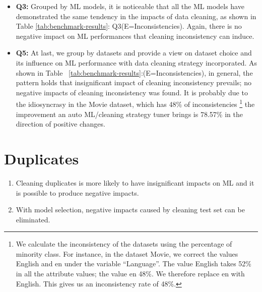 \begin{itemize}
	\item {
		\textbf{Q3:} Grouped by ML models, it is noticeable that all the ML models have demonstrated the same tendency in the impacts of data
		cleaning, as shown in Table \ref{tab:benchmark-results}: Q3(E=Inconsistencies). Again, there is no negative impact on ML performances that cleaning inconsistency can induce.
	}

	\item {
		\textbf{Q5:} At last, we group by datasets and provide a view on dataset
		choice and its influence on ML performance with data cleaning strategy incorporated. As shown in Table ~\ref{tab:benchmark-results}:(E=Inconsistencies),
		in general, the pattern holds that insignificant impact of cleaning inconsistency prevails; no negative impacts of cleaning inconsistency
		was found. It is probably due to the idiosyncrasy in the Movie
		dataset, which has 48\% of inconsistencies \footnote{We calculate the inconsistency of the datasets using the percentage of minority class. For instance, in the dataset Movie, we correct the values English and en under the variable “Language”. The value English takes 52\% in all the attribute values; the value en 48\%. We therefore replace en with English. This gives us an inconsistency rate of 48\%.} the improvement an auto ML/cleaning strategy tuner brings is 78.57\% in the direction of positive changes.
	}
\end{itemize}

\section{Duplicates} \label{sec:duplicates}

\begin{enumerate}
	\item {
		Cleaning duplicates is more likely to have insignificant
		impacts on ML and it is possible to produce negative impacts.
	}
	\item {
		With model selection, negative impacts caused by
		cleaning test set can be eliminated.
	}
\end{enumerate}

